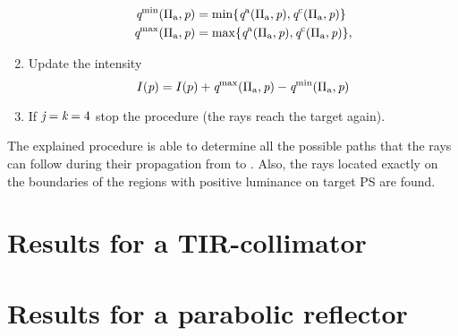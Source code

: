 \begin{enumerate}
\begin{equation*}
\begin{aligned}
\textit{q}^{\textrm{min}}(\Pi_{\textrm{a}}, \textit{p})&=\min\{\textit{q}^{\textrm{a}}(\Pi_{\textrm{a}}, \textit{p}), \textit{q}^{\textrm{c}}(\Pi_{\textrm{a}}, \textit{p})\}\\ 
\textit{q}^{\textrm{max}}(\Pi_{\textrm{a}}, \textit{p})&=\max\{\textit{q}^{\textrm{a}}(\Pi_{\textrm{a}}, \textit{p}), \textit{q}^{\textrm{c}}(\Pi_{\textrm{a}}, \textit{p})\},
\end{aligned}
\end{equation*}
\item Update the intensity $$I(\textit{p}) = I(p)+\textit{q}^{\textrm{max}}(\Pi_{\textrm{a}}, \textit{p})-\textit{q}^{\textrm{min}}(\Pi_{\textrm{a}}, \textit{p})$$
\item If $\textit{j}=\textit{k}= 4$ stop the procedure (the rays reach the target again).
\end{enumerate}
The explained procedure is able to determine all the possible paths that the rays can follow during their propagation from  to . Also, the rays located exactly on the boundaries of the regions with positive luminance on target PS  are found.\\ \indent
%
\section{Results for a TIR-collimator}\label{sec:TIR}
\section{Results for a parabolic reflector}\label{sec:PR}
